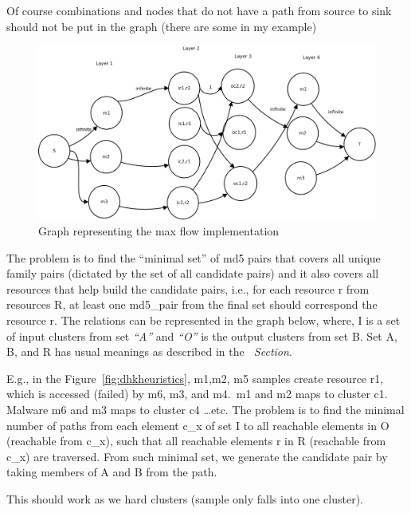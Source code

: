 Of course combinations and nodes that do not have a path from source to sink should not be put in the graph (there are some in my example)
\begin{figure}[htbp]
  \centering
  \includegraphics[scale=0.23]{figures/maxflow.png}
  \caption[Max Flow]{Graph representing the max flow implementation}\label{fig:maxflow}
\end{figure}


The problem is to find the ``minimal set'' of md5 pairs that covers all unique family pairs (dictated by the set of all candidate pairs) and it also covers all resources that help build the candidate pairs, i.e., for each resource r from resources R, at least one md5\_pair from the final set should correspond the resource r.
The relations can be represented in the graph below, where, I is a set of input clusters from set \emph{``A''} and \emph{``O''} is the output clusters from set B. Set A, B, and R has usual meanings as described in the\textit{~ Section}.

E.g., in the Figure~\ref{fig:dhkheuristics},  m1,m2, m5 samples create resource r1, which is accessed (failed) by m6, m3, and m4.\ m1 and m2 maps to cluster c1. Malware m6 and m3 maps to cluster c4 \dots etc.
The problem is to find the minimal number of paths from each element c\_x of set I to all reachable elements in O (reachable from c\_x), such that all reachable elements r in R (reachable from c\_x) are traversed. From such minimal set, we generate the candidate pair by taking members of A and B from the path.

This should work as we hard clusters (sample only falls into one cluster).

